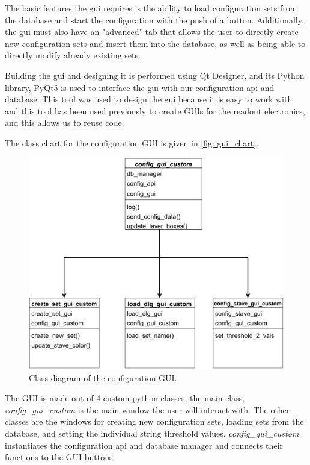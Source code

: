 \documentclass[main.tex]{subfiles}
\begin{document}
The basic features the \gls{gui} requires is the ability to load configuration sets from the database and start the configuration with the push of a button. Additionally, the \gls{gui} must also have an "advanced"-tab that allows the user to directly create new configuration sets and insert them into the database, as well as being able to directly modify already existing sets.

Building the \gls{gui} and designing it is performed using Qt Designer, and its Python library, PyQt5 is used to interface the \gls{gui} with our configuration \gls{api} and database. This tool was used to design the \gls{gui} because it is easy to work with and this tool has been used previously to create GUIs for the readout electronics, and this allows us to reuse code.

The class chart for the configuration GUI is given in \autoref{fig: gui_chart}.

\begin{figure}[!ht]
    \centering
    \includegraphics[width=12cm, scale=1.5]{images/gui_class_diagram.pdf}
    \caption{Class diagram of the configuration GUI.}
    \label{fig: gui_chart}
\end{figure}
\FloatBarrier

The GUI is made out of 4 custom python classes, the main class, \textit{config\_gui\_custom} is the main window the user will interact with. The other classes are the windows for creating new configuration sets, loading sets from the database, and setting the individual string threshold values. \textit{config\_gui\_custom} instantiates the configuration \gls{api} and database manager and connects their functions to the GUI buttons.
\end{document}

